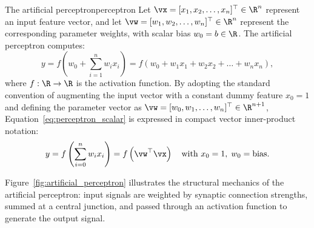 \documentclass[../../main.tex]{subfiles}
\begin{document}
\begin{definition}{The artificial perceptron}{perceptron}
Let $\vx = [x_1, x_2, \dots, x_n]^\top \in \R^n$ represent an input feature vector, and let $\vw = [w_1, w_2, \dots, w_n]^\top \in \R^n$ represent the corresponding parameter weights, with scalar bias $w_0 = b \in \R$. The artificial perceptron computes:
\begin{equation}
\label{eq:perceptron_scalar}
y = f\left( w_0 + \sum_{i=1}^n w_i x_i \right) = f\left( w_0 + w_1 x_1 + w_2 x_2 + \dots + w_n x_n \right),
\end{equation}
where $f: \R \to \R$ is the activation function. By adopting the standard convention of augmenting the input vector with a constant dummy feature $x_0 = 1$ and defining the parameter vector as $\vw = [w_0, w_1, \dots, w_n]^\top \in \R^{n+1}$, Equation~\eqref{eq:perceptron_scalar} is expressed in compact vector inner-product notation:
\begin{equation}
\label{eq:perceptron_vector}
y = f\left( \sum_{i=0}^n w_i x_i \right) = f\left( \vw^\top \vx \right) \quad \text{with } x_0 = 1, \; w_0 = \text{bias}.
\end{equation}
\end{definition}

Figure~\ref{fig:artificial_perceptron} illustrates the structural mechanics of the artificial perceptron: input signals are weighted by synaptic connection strengths, summed at a central junction, and passed through an activation function to generate the output signal.
\end{document}
